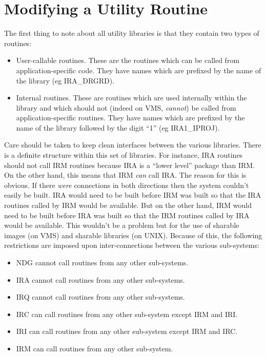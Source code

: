 \section{Modifying a Utility Routine}
\label{SEC:UT}
The first thing to note about all utility libraries is that they contain two 
types of routines:
\begin{itemize}
\item User-callable routines. These are the routines which can be called from 
application-specific code. They have names which are prefixed by the name of the 
library (eg {\small IRA\_DRGRD}).
\item Internal routines. These are routines which are used internally within 
the library and which should not (indeed on {\small VMS}, {\em cannot}) be 
called from application-specific routines. They have names which are prefixed by the name of the 
library followed by the digit ``1'' (eg {\small IRA1\_IPROJ}).
\end{itemize}

Care should be taken to keep clean interfaces between the various libraries.
There is a definite structure within this set of libraries. For instance,
{\small IRA} routines should not call {\small IRM} routines because {\small IRA}
is a ``lower level'' package than {\small IRM}. On the other hand, this means
that {\small IRM} {\em can} call {\small IRA}. The reason for this is obvious.
If there {\em were} connections in both directions then the system couldn't
easily be built. {\small IRA} would need to be built before {\small IRM} was
built so that the {\small IRA} routines called by {\small IRM} would be
available. But on the other hand, {\small IRM} would need to be built before
{\small IRA} was built so that the {\small IRM} routines called by {\small IRA}
would be available. This wouldn't be a problem but for the use of sharable
images (on {\small VMS}) and sharable libraries (on {\small UNIX}). Because of 
this, the following restrictions are imposed upon inter-connections between the 
various sub-systems:

\begin{itemize}
\item {\small NDG} cannot call routines from any other sub-systems.
\item {\small IRA} cannot call routines from any other sub-systems.
\item {\small IRQ} cannot call routines from any other sub-systems.
\item {\small IRC} can call routines from any other sub-system except {\small 
IRM} and {\small IRI}.
\item {\small IRI} can call routines from any other sub-system except {\small 
IRM} and {\small IRC}.
\item {\small IRM} can call routines from any other sub-system.
\end{itemize}

